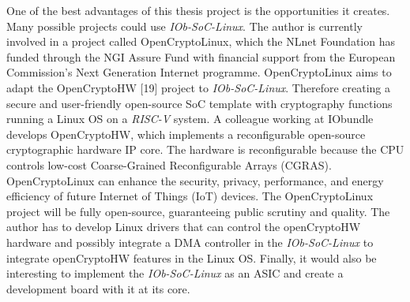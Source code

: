 One of the best advantages of this thesis project is the opportunities it creates. Many possible projects could use \textit{IOb-SoC-Linux}. The author is currently involved in a project called OpenCryptoLinux, which the NLnet Foundation has funded through the NGI Assure Fund with financial support from the European Commission's Next Generation Internet programme. OpenCryptoLinux aims to adapt the OpenCryptoHW [19] project to \textit{IOb-SoC-Linux}. Therefore creating a secure and user-friendly open-source SoC template with cryptography functions running a Linux OS on a \textit{RISC-V} system. A colleague working at IObundle develops OpenCryptoHW, which implements a reconfigurable open-source cryptographic hardware IP core. The hardware is reconfigurable because the CPU controls low-cost Coarse-Grained Reconfigurable Arrays (CGRAS). OpenCryptoLinux can enhance the security, privacy, performance, and energy efficiency of future Internet of Things (IoT) devices. The OpenCryptoLinux project will be fully open-source, guaranteeing public scrutiny and quality. The author has to develop Linux drivers that can control the openCryptoHW hardware and possibly integrate a DMA controller in the \textit{IOb-SoC-Linux} to integrate openCryptoHW features in the Linux OS. Finally, it would also be interesting to implement the \textit{IOb-SoC-Linux} as an ASIC and create a development board with it at its core.
